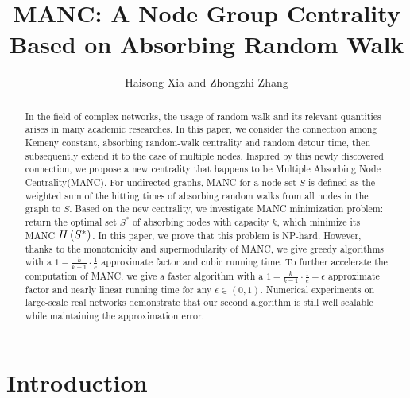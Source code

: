 \documentclass[sigconf]{acmart}
\begin{document}
\sloppy
\fancyhead{}
\title{MANC: A Node Group Centrality Based on Absorbing Random Walk}
\author{Haisong Xia and Zhongzhi Zhang \footnotemark}
\begin{abstract}
  In the field of complex networks, the usage of random walk and its relevant quantities arises in many academic researches.
  In this paper, we consider the connection among Kemeny constant, absorbing random-walk centrality and random detour time, then subsequently extend it to the case of multiple nodes.
  Inspired by this newly discovered connection, we propose a new centrality that happens to be Multiple Absorbing Node Centrality(MANC).
  For undirected graphs, MANC for a node set \(S\) is defined as the weighted sum of the hitting times of absorbing random walks from all nodes in the graph to \(S\).
  Based on the new centrality, we investigate MANC minimization problem: return the optimal set \(S^*\) of absorbing nodes with capacity \(k\), which minimize its MANC \(H\left(S^*\right)\).
  In this paper, we prove that this problem is NP-hard.
  However, thanks to the monotonicity and supermodularity of MANC, we give greedy algorithms with a \(1-\frac{k}{k-1}\cdot\frac{1}{e}\) approximate factor and cubic running time.
  To further accelerate the computation of MANC, we give a faster algorithm with a \(1-\frac{k}{k-1}\cdot\frac{1}{e}-\epsilon\) approximate factor and nearly linear running time for any \(\epsilon\in(0,1)\).
  Numerical experiments on large-scale real networks demonstrate that our second algorithm is still well scalable while maintaining the approximation error.
\end{abstract}
\maketitle
\renewcommand{\thefootnote}{*}

\section{Introduction}\label{sec:intro}
\end{document}

